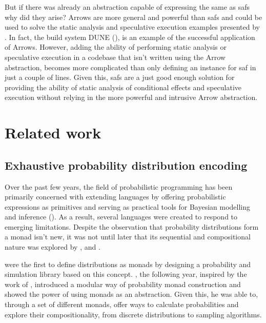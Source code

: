 \documentclass[
  oneside,
  11pt, a4paper,
  footinclude=true,
  headinclude=true,
  cleardoublepage=empty
]{scrbook}
\theoremstyle{definition}
\theoremstyle{definition}
\begin{document}
	            But if there was already an abstraction capable of expressing the same as \gls{saf}s why did they arise? Arrows are more general and powerful than \gls{saf}s and could be used to solve the static analysis and speculative execution examples presented by \cite{andrey2019selective}. In fact, the build system DUNE (\cite{dune_2018}), is an example of the successful application of Arrows. However, adding the ability of performing static analysis or speculative execution in a codebase that isn't written using the Arrow abstraction, becomes more complicated than only defining an instance for \gls{saf} in just a couple of lines. Given this, \gls{saf}s are a just good enough solution for providing the ability of static analysis of conditional effects and speculative execution without relying in the more powerful and intrusive Arrow abstraction.
	            
	    \section{Related work}\label{sec-related-work}
        
        \subsection{Exhaustive probability distribution encoding}
        
        Over the past few years, the field of probabilistic programming has been primarily concerned with extending languages by offering probabilistic expressions as primitives and serving as practical tools for Bayesian modelling and inference (\cite{erwig_kollmansberger_2006}). As a result, several languages were created to respond to emerging limitations. Despite the observation that probability distributions form a monad isn't new, it was not until later that its sequential and compositional nature was explored by \cite{Ramsey:2002:SLC:565816.503288}, \cite{Goodman:2013:PPP:2480359.2429117} and \cite{Gordon:2013:MPB:2429069.2429119}.
        
        \cite {erwig_kollmansberger_2006} were the first to define distributions as monads by designing a probability and simulation library based on this concept. \cite{kidd2007build}, the following year, inspired by the work of \cite{Ramsey:2002:SLC:565816.503288}, introduced a modular way of probability monad construction and showed the power of using monads as an abstraction. Given this, he was able to, through a set of different monads, offer ways to calculate probabilities and explore their compositionality, from discrete distributions to sampling algorithms.
                
\end{document}
